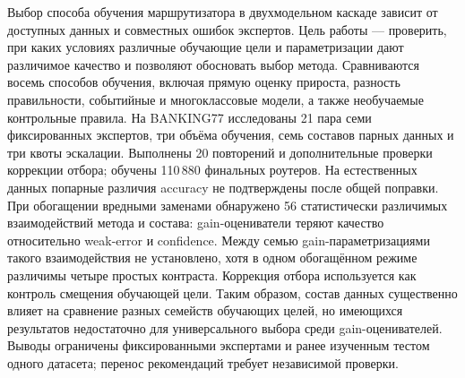 Выбор способа обучения маршрутизатора в двухмодельном каскаде зависит
от доступных данных и совместных ошибок экспертов. Цель работы ---
проверить, при каких условиях различные обучающие цели и параметризации
дают различимое качество и позволяют обосновать выбор метода.
Сравниваются восемь способов обучения, включая прямую оценку прироста,
разность правильности, событийные и многоклассовые модели,
а также необучаемые контрольные правила. На BANKING77 исследованы
21 пара семи фиксированных экспертов, три объёма обучения,
семь составов парных данных и три квоты эскалации.
Выполнены 20 повторений и дополнительные проверки коррекции отбора;
обучены 110\,880 финальных роутеров.
На естественных данных попарные различия accuracy не подтверждены
после общей поправки. При обогащении вредными заменами обнаружено
56 статистически различимых взаимодействий метода и состава:
gain-оцениватели теряют качество относительно weak-error и confidence.
Между семью gain-параметризациями такого взаимодействия не установлено,
хотя в одном обогащённом режиме различимы четыре простых контраста.
Коррекция отбора используется как контроль смещения обучающей цели.
Таким образом, состав данных существенно влияет на сравнение разных
семейств обучающих целей, но имеющихся результатов недостаточно
для универсального выбора среди gain-оценивателей.
Выводы ограничены фиксированными экспертами и ранее изученным тестом
одного датасета; перенос рекомендаций требует независимой проверки.
